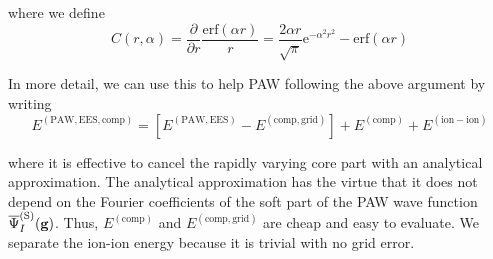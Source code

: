 \documentclass[paper=a4, fontsize=11pt]{article} %
\numberwithin{equation}{section} %
\numberwithin{figure}{section} %
\numberwithin{table}{section} %
\newcommand{\p}{\partial}
\newcommand{\bg}{{\bf{g}}}
\newcommand{\rS}{{\mathrm{S}}}
\newcommand{\rEES}{{\mathrm{EES}}}
\newcommand{\re}{{\mathrm{e}}}
\newcommand{\rerf}{{\mathrm{erf}}}
\newcommand{\rP}{{\mathrm{PAW}}}
\newcommand{\rcomp}{{\mathrm{comp}}}
\newcommand{\al}{{\alpha}}
\newcommand{\psigs}{{\overline \Psi_I^{(\rS)}(\bg)}}
\begin{document}
where we define
\begin{equation}\label{eq:CJK}
C(r,\al) = \frac{\p}{\p r}\frac{\rerf(\al r)}{r} =\frac{2\al r}{\sqrt{\pi}}\re^{-\al^2 r^2} - \rerf(\al r)
\end{equation}


In more detail, we can use this to help PAW following the above argument by writing
\begin{equation}
E^{(\rP,\rEES,\rcomp)} = \left[ E^{(\rP,\rEES)} - E^{(\rcomp,\mathrm{grid})}\right] + E^{(\rcomp)} + E^{(\mathrm{ion-ion})}
\end{equation}

where it is effective to cancel the rapidly varying core part with an analytical approximation. The analytical approximation has the virtue that it does not depend on the Fourier coefficients of the soft part of the PAW wave function $\psigs$. Thus, $E^{(\rcomp)}$ and $E^{(\rcomp,\mathrm{grid})}$ are cheap and easy to evaluate. We separate the ion-ion energy because it is trivial with no grid error.\\
\end{document}
